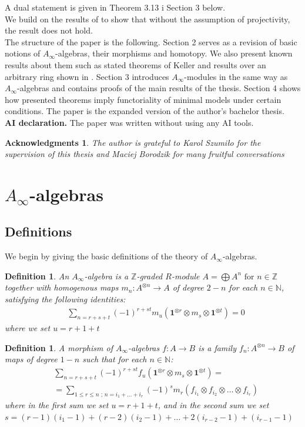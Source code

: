 \documentclass[a4paper, 12pt, openany, fleqn]{amsart}
\newtheorem{definition}[theorem]{Definition}
\newtheorem*{ack}{Acknowledgments}
\begin{document}
A dual statement is given in Theorem 3.13 i Section 3 below.\\
We build on the results of \cite{A-infty_rings} to show that without the assumption of projectivity, the result does not hold.\\
The structure of the paper is the following. Section 2 serves as a revision of basic notions of $A_\infty$-algebras, their morphisms and homotopy. We also present known results about them such as stated theorems of Keller and results over an arbitrary ring shown in \cite{A-infty_rings}. Section 3 introduces $A_\infty$-modules in the same way as $A_\infty$-algebras and contains proofs of the main results of the thesis. Section 4 shows how presented theorems imply functoriality of minimal models under certain conditions. The paper is the expanded version of the author's bachelor thesis.\\

\textbf{AI declaration.} The paper was written without using any AI tools.
\begin{ack}
    The author is grateful to Karol Szumiło for the supervision of this thesis and Maciej Borodzik for many fruitful conversations
\end{ack}
\section{$A_\infty$-algebras}
\subsection{Definitions}
We begin by giving the basic definitions of the theory of $A_\infty$-algebras.
\begin{definition}
An $A_\infty$-algebra is a $\mathbb{Z}$-graded $R$-module $A=\bigoplus A^n \text{ for } n\in \mathbb{Z}$ together with homogenous maps $m_n : A^{\otimes n}\longrightarrow A$ of degree $2-n$ for each $n\in\mathbb{N}$, satisfying the following identities:
\begin{align*}
    &\sum_{n=r+s+t} (-1)^{r+st}m_u(\mathbf{1}^{\otimes r}\otimes m_s \otimes \mathbf{1}^{\otimes t}) = 0
\end{align*}
where we set $u=r+1+t$
\end{definition}
\begin{definition}
    A morphism of $A_\infty$-algebras $f:A\longrightarrow B$ is a family $f_n:A^{\otimes n} \longrightarrow B$ of maps of degree $1-n$ such that for each $n\in\mathbb{N}$:
    \begin{align*}
        &\sum_{n=r+s+t} (-1)^{r+st}f_u(\mathbf{1}^{\otimes r}\otimes m_s \otimes\mathbf{1}^{\otimes t})=\\ &=\sum_{1\leq r\leq n\text{ ; } n=i_1 +\dots +i_r} (-1)^s m_r(f_{i_1}\otimes f_{i_2}\otimes\dots\otimes f_{i_r})
    \end{align*}
    where in the first sum we set $u=r+1+t$, and in the second sum we set $s=(r-1)(i_1-1)+(r-2)(i_2-1)+\dots +2(i_{r-2}-1) + (i_{r-1}-1)$
\end{definition}
\end{document}
